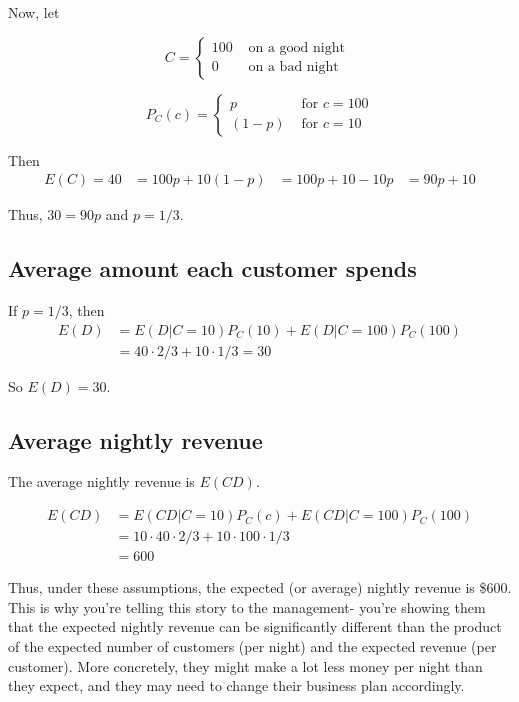 \documentclass[paper=a4, fontsize=11pt]{scrartcl} %
\numberwithin{equation}{section} %
\numberwithin{figure}{section} %
\numberwithin{table}{section} %
\begin{document}
Now, let

\[
C = 
\begin{cases}
   100 & \textrm{ on a good night }\\
   0 & \textrm{ on a bad night }
\end{cases}
\]

\[
P_C(c) = 
\begin{cases}
   p & \textrm{ for } c  = 100 \\
   (1-p) & \textrm{ for } c = 10
\end{cases}
\]

Then
\begin{align*}
E(C) = 40 &= 100p + 10(1-p)
   &= 100p + 10 -10p
   &= 90p + 10
\end{align*}

Thus, $30 = 90p$ and $p = 1/3$. 

\subsection{Average amount each customer spends}

If $p = 1/3$, then
\begin{align*}
E(D) &= E(D | C=10) P_C(10) + E(D | C=100)P_C(100)\\
   &= 40 \cdot 2/3 + 10 \cdot 1/3 = 30
\end{align*}

So $E(D) = 30$.

\subsection{Average nightly revenue}

The average nightly revenue is $E(CD)$.

\begin{align*}
E(CD) &= E(CD | C=10) P_C(c) + E(CD | C=100) P_C(100)\\
   &= 10 \cdot 40 \cdot 2/3 + 10 \cdot 100 \cdot 1/3\\
   &= 600
\end{align*}

Thus, under these assumptions, the expected (or average) nightly revenue is \$600. This is why you're telling this story to the management- you're showing them that the expected nightly revenue can be significantly different than the product of the expected number of customers (per night) and the expected revenue (per customer). More concretely, they might make a lot less money per night than they expect, and they may need to change their business plan accordingly.
\end{document}
